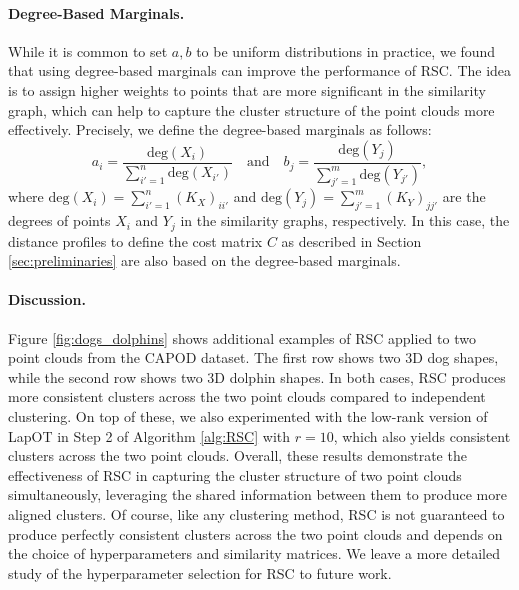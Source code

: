 \documentclass{article}
\theoremstyle{definition}
\begin{document}
\paragraph{Degree-Based Marginals.}
While it is common to set $a, b$ to be uniform distributions in practice, we found that using degree-based marginals can improve the performance of RSC. The idea is to assign higher weights to points that are more significant in the similarity graph, which can help to capture the cluster structure of the point clouds more effectively. Precisely, we define the degree-based marginals as follows:
\begin{equation*}
    a_i = \frac{\mathrm{deg}(X_i)}{\sum_{i' = 1}^n \mathrm{deg}(X_{i'})} \quad \text{and} \quad b_j = \frac{\mathrm{deg}(Y_j)}{\sum_{j' = 1}^m \mathrm{deg}(Y_{j'})},
\end{equation*}
where $\mathrm{deg}(X_i) = \sum_{i' = 1}^n (K_X)_{i i'}$ and $\mathrm{deg}(Y_j) = \sum_{j' = 1}^m (K_Y)_{j j'}$ are the degrees of points $X_i$ and $Y_j$ in the similarity graphs, respectively. In this case, the distance profiles to define the cost matrix $C$ as described in Section \ref{sec:preliminaries} are also based on the degree-based marginals.

\paragraph{Discussion.}
Figure \ref{fig:dogs_dolphins} shows additional examples of RSC applied to two point clouds from the CAPOD dataset. The first row shows two 3D dog shapes, while the second row shows two 3D dolphin shapes. In both cases, RSC produces more consistent clusters across the two point clouds compared to independent clustering. On top of these, we also experimented with the low-rank version of LapOT in Step 2 of Algorithm \ref{alg:RSC} with $r = 10$, which also yields consistent clusters across the two point clouds. Overall, these results demonstrate the effectiveness of RSC in capturing the cluster structure of two point clouds simultaneously, leveraging the shared information between them to produce more aligned clusters. Of course, like any clustering method, RSC is not guaranteed to produce perfectly consistent clusters across the two point clouds and depends on the choice of hyperparameters and similarity matrices. We leave a more detailed study of the hyperparameter selection for RSC to future work.
\end{document}
